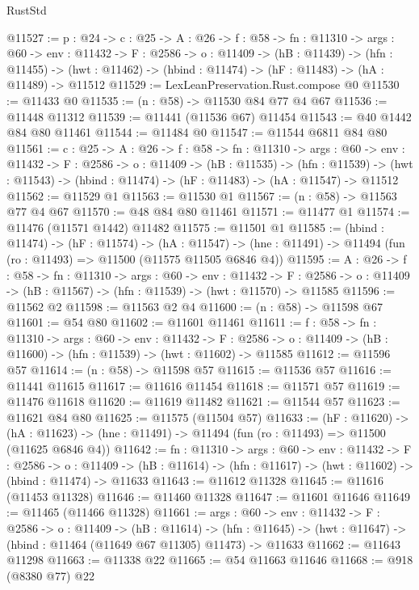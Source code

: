\begin{lexlean}{RustStd}
\begin{coremodule}
@11527 := {p : @24} ->
  {c : @25} ->
  {A : @26} ->
  {f : @58} ->
  {fn : @11310} ->
  {args : @60} ->
  {env : @11432} ->
  {F : @2586} ->
  {o : @11409} ->
  (hB : @11439) ->
  (hfn : @11455) -> (hwt : @11462) -> (hbind : @11474) -> (hF : @11483) -> (hA : @11489) -> @11512
@11529 := LexLeanPreservation.Rust.compose @0
@11530 := @11433 @0
@11535 := (n : @58) -> @11530 @84 @77 @4 @67
@11536 := @11448 @11312
@11539 := @11441 (@11536 @67) @11454
@11543 := @40 @1442 @84 @80 @11461
@11544 := @11484 @0
@11547 := @11544 @6811 @84 @80
@11561 := {c : @25} ->
  {A : @26} ->
  {f : @58} ->
  {fn : @11310} ->
  {args : @60} ->
  {env : @11432} ->
  {F : @2586} ->
  {o : @11409} ->
  (hB : @11535) ->
  (hfn : @11539) -> (hwt : @11543) -> (hbind : @11474) -> (hF : @11483) -> (hA : @11547) -> @11512
@11562 := @11529 @1
@11563 := @11530 @1
@11567 := (n : @58) -> @11563 @77 @4 @67
@11570 := @48 @84 @80 @11461
@11571 := @11477 @1
@11574 := @11476 (@11571 @1442) @11482
@11575 := @11501 @1
@11585 := (hbind : @11474) ->
  (hF : @11574) ->
  (hA : @11547) -> (hne : @11491) -> @11494 (fun (ro : @11493) => @11500 (@11575 @11505 @6846 @4))
@11595 := {A : @26} ->
  {f : @58} ->
  {fn : @11310} ->
  {args : @60} ->
  {env : @11432} ->
  {F : @2586} -> {o : @11409} -> (hB : @11567) -> (hfn : @11539) -> (hwt : @11570) -> @11585
@11596 := @11562 @2
@11598 := @11563 @2 @4
@11600 := (n : @58) -> @11598 @67
@11601 := @54 @80
@11602 := @11601 @11461
@11611 := {f : @58} ->
  {fn : @11310} ->
  {args : @60} ->
  {env : @11432} ->
  {F : @2586} -> {o : @11409} -> (hB : @11600) -> (hfn : @11539) -> (hwt : @11602) -> @11585
@11612 := @11596 @57
@11614 := (n : @58) -> @11598 @57
@11615 := @11536 @57
@11616 := @11441 @11615
@11617 := @11616 @11454
@11618 := @11571 @57
@11619 := @11476 @11618
@11620 := @11619 @11482
@11621 := @11544 @57
@11623 := @11621 @84 @80
@11625 := @11575 (@11504 @57)
@11633 := (hF : @11620) ->
  (hA : @11623) -> (hne : @11491) -> @11494 (fun (ro : @11493) => @11500 (@11625 @6846 @4))
@11642 := {fn : @11310} ->
  {args : @60} ->
  {env : @11432} ->
  {F : @2586} ->
  {o : @11409} -> (hB : @11614) -> (hfn : @11617) -> (hwt : @11602) -> (hbind : @11474) -> @11633
@11643 := @11612 @11328
@11645 := @11616 (@11453 @11328)
@11646 := @11460 @11328
@11647 := @11601 @11646
@11649 := @11465 (@11466 @11328)
@11661 := {args : @60} ->
  {env : @11432} ->
  {F : @2586} ->
  {o : @11409} ->
  (hB : @11614) ->
  (hfn : @11645) -> (hwt : @11647) -> (hbind : @11464 (@11649 @67 @11305) @11473) -> @11633
@11662 := @11643 @11298
@11663 := @11338 @22
@11665 := @54 @11663 @11646
@11668 := @918 (@8380 @77) @22

\end{coremodule}
\end{lexlean}
